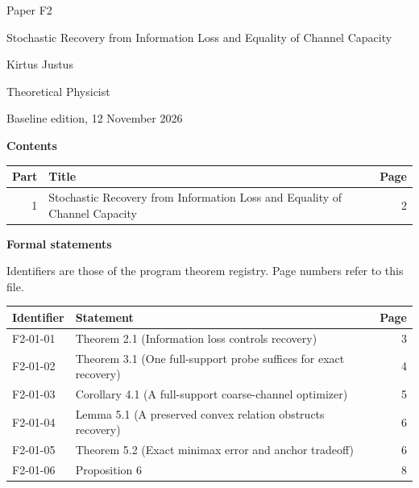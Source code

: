 \documentclass[11pt,a4paper]{article}
\begin{document}
\thispagestyle{empty}\pagestyle{empty}
{\small\sffamily \ProgramTitle\hfill Paper F2\par}
\vspace*{12mm}
{\LARGE\bfseries\raggedright{} Stochastic Recovery from Information Loss and Equality of Channel Capacity\par}
\vspace{9mm}
{\large Kirtus Justus\par}\vspace{1mm}Theoretical Physicist\par\AuthorLocation\par\vspace{2mm}Baseline edition, 12 November 2026\par\vspace{8mm}
\textbf{Contents}\par\vspace{1mm}
{\small\begin{longtable}{@{}r>{\raggedright\arraybackslash}p{}r@{}}
\toprule Part & Title & Page\\\midrule\endhead
1 & Stochastic Recovery from Information Loss and Equality of Channel Capacity & 2\\
\bottomrule\end{longtable}}
\vspace{2mm}\textbf{Formal statements}\par\vspace{1mm}
{\footnotesize Identifiers are those of the program theorem registry. Page numbers refer to this file.\par}
{\footnotesize\begin{longtable}{@{}l>{\raggedright\arraybackslash}p{}r@{}}
\toprule Identifier & Statement & Page\\\midrule\endhead
F2-01-01 & Theorem 2.1 (Information loss controls recovery) & 3\\
F2-01-02 & Theorem 3.1 (One full-support probe suffices for exact recovery) & 4\\
F2-01-03 & Corollary 4.1 (A full-support coarse-channel optimizer) & 5\\
F2-01-04 & Lemma 5.1 (A preserved convex relation obstructs recovery) & 6\\
F2-01-05 & Theorem 5.2 (Exact minimax error and anchor tradeoff) & 6\\
F2-01-06 & Proposition 6 & 8\\
\bottomrule\end{longtable}}
\end{document}

